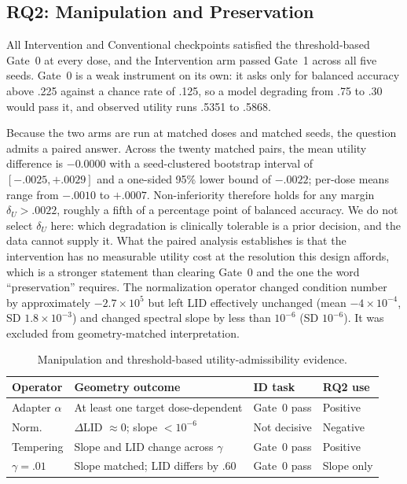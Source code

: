 \documentclass[11pt,a4paper]{article}
\begin{document}
\subsection{RQ2: Manipulation and Preservation}
All Intervention and Conventional checkpoints satisfied the threshold-based Gate~0 at every dose, and the Intervention arm passed Gate~1 across all five seeds. Gate~0 is a weak instrument on its own: it asks only for balanced accuracy above .225 against a chance rate of .125, so a model degrading from .75 to .30 would pass it, and observed utility runs .5351 to .5868.

Because the two arms are run at matched doses and matched seeds, the question admits a paired answer. Across the twenty matched pairs, the mean utility difference is $-0.0000$ with a seed-clustered bootstrap interval of $[-.0025,+.0029]$ and a one-sided 95\% lower bound of $-.0022$; per-dose means range from $-.0010$ to $+.0007$. Non-inferiority therefore holds for any margin $\delta_U>.0022$, roughly a fifth of a percentage point of balanced accuracy. We do not select $\delta_U$ here: which degradation is clinically tolerable is a prior decision, and the data cannot supply it. What the paired analysis establishes is that the intervention has no measurable utility cost at the resolution this design affords, which is a stronger statement than clearing Gate~0 and the one the word ``preservation'' requires. The normalization operator changed condition number by approximately $-2.7\times10^{5}$ but left LID effectively unchanged (mean $-4\times10^{-4}$, SD $1.8\times10^{-3}$) and changed spectral slope by less than $10^{-6}$ (SD $10^{-6}$). It was excluded from geometry-matched interpretation.

\begin{table}[t]
\centering
\caption{Manipulation and threshold-based utility-admissibility evidence.}
\label{tab:rq2-manipulation}
\small
\begin{tabular}{p{2.2cm}p{6.0cm}p{3.0cm}p{2.2cm}}
\toprule
Operator & Geometry outcome & ID task & RQ2 use\\
\midrule
Adapter $\alpha$ & At least one target dose-dependent & Gate~0 pass & Positive\\
Norm. & $\Delta$LID $\approx0$; slope $<10^{-6}$ & Not decisive & Negative\\
Tempering & Slope and LID change across $\gamma$ & Gate~0 pass & Positive\\
$\gamma=.01$ & Slope matched; LID differs by .60 & Gate~0 pass & Slope only\\
\bottomrule
\end{tabular}
\end{table}
\end{document}
